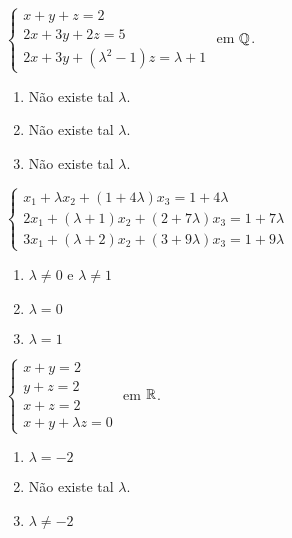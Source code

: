 \documentclass[12pt]{exam}
\begin{document}
\begin{exercicio}
  $
    \begin{cases}
      x + y + z = 2\\
      2x + 3y + 2z = 5\\
      2x + 3y + (\lambda^2 - 1)z = \lambda + 1
    \end{cases}
  $
  em $\mathbb{Q}$.
  \begin{solucao}
    \begin{enumerate}[label={\alph*})]
      \item Não existe tal $\lambda$.
      \item Não existe tal $\lambda$.
      \item Não existe tal $\lambda$.
    \end{enumerate}
  \end{solucao}
\end{exercicio}

\begin{exercicio}
  $
    \begin{cases}
      x_1 + \lambda x_2 + (1 + 4\lambda )x_3 = 1 + 4\lambda \\
      2x_1 + (\lambda  + 1)x_2 + (2 + 7\lambda )x_3 = 1 + 7\lambda \\
      3x_1 + (\lambda  + 2)x_2 + (3 + 9\lambda )x_3 = 1 + 9\lambda
    \end{cases}
  $
  \begin{solucao}
    \begin{enumerate}[label={\alph*})]
      \item $\lambda \ne 0$ e $\lambda \ne 1$
      \item $\lambda = 0$
      \item $\lambda = 1$
    \end{enumerate}
  \end{solucao}
\end{exercicio}

\begin{exercicio}\label{sistemasfim}
  $
    \begin{cases}
      x + y = 2\\
      y + z = 2\\
      x + z = 2\\
      x + y + \lambda z = 0
    \end{cases}
  $
  em $\mathbb{R}$.
  \begin{solucao}
    \begin{enumerate}[label={\alph*})]
      \item $\lambda = -2$
      \item Não existe tal $\lambda$.
      \item $\lambda \ne -2$
    \end{enumerate}
  \end{solucao}
\end{exercicio}
\end{document}
